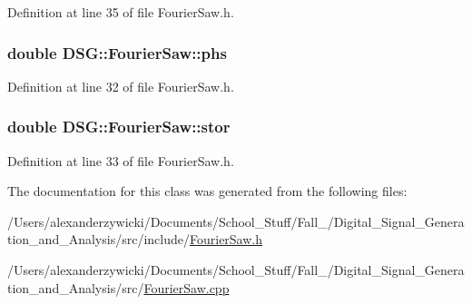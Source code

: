 Definition at line 35 of file Fourier\+Saw.\+h.

\hypertarget{classDSG_1_1FourierSaw_a3a743cafd72c9a0996c90db106607845}{
\subsubsection[{phs}]{\setlength{\rightskip}{0pt plus 5cm}double D\+S\+G\+::\+Fourier\+Saw\+::phs\hspace{0.3cm}{\ttfamily [protected]}}}\label{classDSG_1_1FourierSaw_a3a743cafd72c9a0996c90db106607845}


Definition at line 32 of file Fourier\+Saw.\+h.

\hypertarget{classDSG_1_1FourierSaw_a2e47297223e95f05e614d8beb81075b3}{
\subsubsection[{stor}]{\setlength{\rightskip}{0pt plus 5cm}double D\+S\+G\+::\+Fourier\+Saw\+::stor\hspace{0.3cm}{\ttfamily [protected]}}}\label{classDSG_1_1FourierSaw_a2e47297223e95f05e614d8beb81075b3}


Definition at line 33 of file Fourier\+Saw.\+h.



The documentation for this class was generated from the following files\+:\begin{DoxyCompactItemize}
\item 
/\+Users/alexanderzywicki/\+Documents/\+School\+\_\+\+Stuff/\+Fall\+\_/\+Digital\+\_\+\+Signal\+\_\+\+Generation\+\_\+and\+\_\+\+Analysis/src/include/\hyperlink{FourierSaw_8h}{Fourier\+Saw.\+h}\item 
/\+Users/alexanderzywicki/\+Documents/\+School\+\_\+\+Stuff/\+Fall\+\_/\+Digital\+\_\+\+Signal\+\_\+\+Generation\+\_\+and\+\_\+\+Analysis/src/\hyperlink{FourierSaw_8cpp}{Fourier\+Saw.\+cpp}\end{DoxyCompactItemize}
